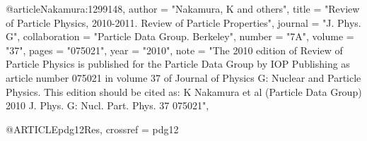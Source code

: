 @article{Nakamura:1299148,
      author        = "Nakamura, K and others",
      title         = "{Review of Particle Physics, 2010-2011. Review of Particle
                       Properties}",
      journal       = "J. Phys. G",
      collaboration = "Particle Data Group. Berkeley",
      number        = "7A",
      volume        = "37",
      pages         = "075021",
      year          = "2010",
      note          = "The 2010 edition of Review of Particle Physics is
                       published for the Particle Data Group by IOP Publishing as
                       article number 075021 in volume 37 of Journal of Physics G:
                       Nuclear and Particle Physics. This edition should be cited
                       as: K Nakamura et al (Particle Data Group) 2010 J. Phys. G:
                       Nucl. Part. Phys. 37 075021",
}

@ARTICLE{pdg12Res,
    crossref = {pdg12}
}


